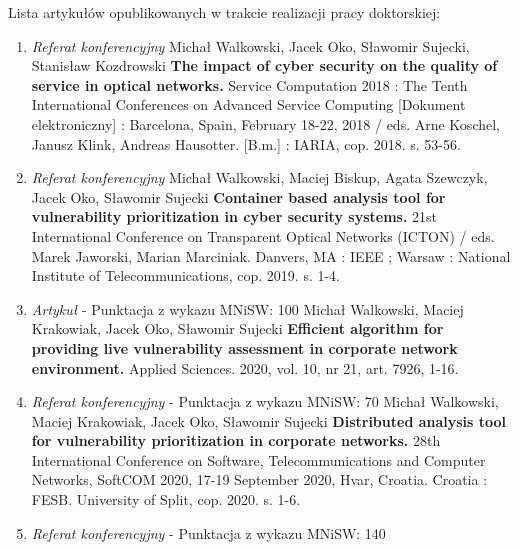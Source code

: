 \pagestyle{empty}
Lista artykułów opublikowanych w trakcie realizacji pracy doktorskiej:
\begin{enumerate}
    \item {\emph{Referat konferencyjny}\newline
    Michał Walkowski, Jacek Oko, Sławomir Sujecki, Stanisław Kozdrowski\newline
    \textbf{The impact of cyber security on the quality of service in optical networks.}\newline
    Service Computation 2018 : The Tenth International Conferences on Advanced Service Computing [Dokument elektroniczny] : Barcelona, Spain, February 18-22, 2018 / eds. Arne Koschel, Janusz Klink, Andreas Hausotter. [B.m.] : IARIA, cop. 2018. s. 53-56.}
    \item {\emph{Referat konferencyjny} \newline
    Michał Walkowski, Maciej Biskup, Agata Szewczyk, Jacek Oko, Sławomir Sujecki\newline
    \textbf{Container based analysis tool for vulnerability prioritization in cyber security systems.} 21st International Conference on Transparent Optical Networks (ICTON) / eds. Marek Jaworski, Marian Marciniak. Danvers, MA : IEEE ; Warsaw : National Institute of Telecommunications, cop. 2019. s. 1-4.}
    \item {\emph{Artykuł} - Punktacja z wykazu MNiSW: 100\newline
    Michał Walkowski, Maciej Krakowiak, Jacek Oko, Sławomir Sujecki\newline
    \textbf{Efficient algorithm for providing live vulnerability assessment in corporate network environment.}\newline
    Applied Sciences. 2020, vol. 10, nr 21, art. 7926, 1-16.}
    \item{\emph{Referat konferencyjny} - Punktacja z wykazu MNiSW: 70 \newline
    Michał Walkowski, Maciej Krakowiak, Jacek Oko, Sławomir Sujecki\newline
    \textbf{Distributed analysis tool for vulnerability prioritization in corporate networks.}\newline
    28th International Conference on Software, Telecommunications and Computer Networks, SoftCOM 2020, 17-19 September 2020, Hvar, Croatia. Croatia : FESB. University of Split, cop. 2020. s. 1-6.}
    \item{\emph{Referat konferencyjny} - Punktacja z wykazu MNiSW: 140\newline
}
\end{enumerate}

